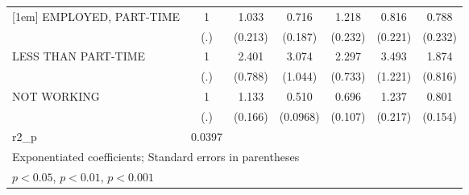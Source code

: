 {\begin{tabular}{l*{6}{c}}
[1em]
EMPLOYED, PART-TIME           &         1         &     1.033         &     0.716         &     1.218         &     0.816         &     0.788         \\
                              &       (.)         &   (0.213)         &   (0.187)         &   (0.232)         &   (0.221)         &   (0.232)         \\
[1em]
LESS THAN PART-TIME           &         1         &     2.401\sym{**} &     3.074\sym{***}&     2.297\sym{**} &     3.493\sym{***}&     1.874         \\
                              &       (.)         &   (0.788)         &   (1.044)         &   (0.733)         &   (1.221)         &   (0.816)         \\
[1em]
NOT WORKING                   &         1         &     1.133         &     0.510\sym{***}&     0.696\sym{*}  &     1.237         &     0.801         \\
                              &       (.)         &   (0.166)         &  (0.0968)         &   (0.107)         &   (0.217)         &   (0.154)         \\
\hline
r2\_p                          &    0.0397         &                   &                   &                   &                   &                   \\
\hline\hline
\multicolumn{7}{l}{\footnotesize Exponentiated coefficients; Standard errors in parentheses}\\
\multicolumn{7}{l}{\footnotesize \sym{*} \(p<0.05\), \sym{**} \(p<0.01\), \sym{***} \(p<0.001\)}\\
\end{tabular}
}
